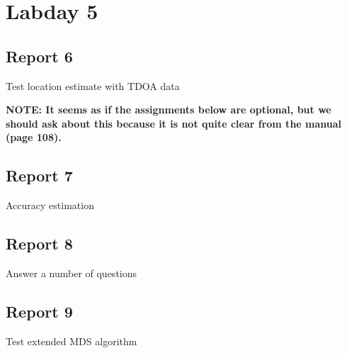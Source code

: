 \documentclass[11pt,titlepage]{report}
\begin{document}
\section{Labday 5}
\subsection{Report 6}
Test location estimate with TDOA data

\textbf{NOTE: It seems as if the assignments below are optional, but we should ask about this because it is not quite clear from the manual (page 108).}

\subsection{Report 7}
Accuracy estimation

\subsection{Report 8}
Answer a number of questions

\subsection{Report 9}
Test extended MDS algorithm

	
\end{document}
